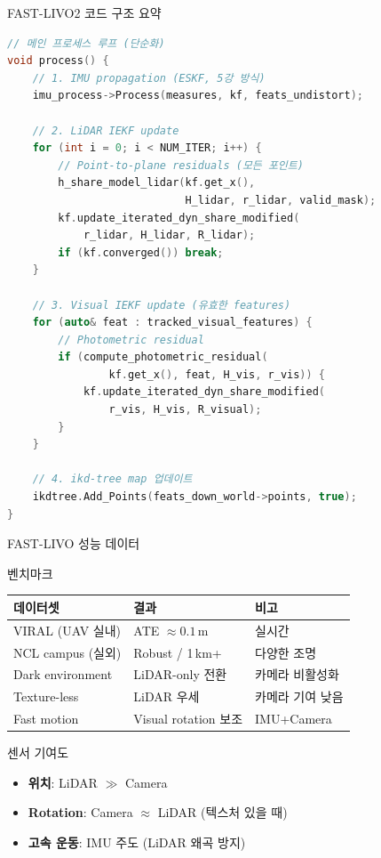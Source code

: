 \begin{frame}[fragile,shrink=10]{FAST-LIVO2 코드 구조 요약}
\begin{lstlisting}[language=C++]
// 메인 프로세스 루프 (단순화)
void process() {
    // 1. IMU propagation (ESKF, 5강 방식)
    imu_process->Process(measures, kf, feats_undistort);

    // 2. LiDAR IEKF update
    for (int i = 0; i < NUM_ITER; i++) {
        // Point-to-plane residuals (모든 포인트)
        h_share_model_lidar(kf.get_x(),
                            H_lidar, r_lidar, valid_mask);
        kf.update_iterated_dyn_share_modified(
            r_lidar, H_lidar, R_lidar);
        if (kf.converged()) break;
    }

    // 3. Visual IEKF update (유효한 features)
    for (auto& feat : tracked_visual_features) {
        // Photometric residual
        if (compute_photometric_residual(
                kf.get_x(), feat, H_vis, r_vis)) {
            kf.update_iterated_dyn_share_modified(
                r_vis, H_vis, R_visual);
        }
    }

    // 4. ikd-tree map 업데이트
    ikdtree.Add_Points(feats_down_world->points, true);
}
\end{lstlisting}
\end{frame}

\begin{frame}{FAST-LIVO 성능 데이터}
  \begin{block}{벤치마크}
    \begin{center}
      \begin{tabular}{lll}
        \hline
        \textbf{데이터셋} & \textbf{결과} & \textbf{비고} \\
        \hline
        VIRAL (UAV 실내) & ATE $\approx0.1$\,m & 실시간 \\
        NCL campus (실외) & Robust / 1\,km+ & 다양한 조명 \\
        Dark environment & LiDAR-only 전환 & 카메라 비활성화 \\
        Texture-less & LiDAR 우세 & 카메라 기여 낮음 \\
        Fast motion & Visual rotation 보조 & IMU+Camera \\
        \hline
      \end{tabular}
    \end{center}
  \end{block}
  \pause
  \begin{block}{센서 기여도}
    \begin{itemize}
      \item \textbf{위치}: LiDAR $\gg$ Camera
      \item \textbf{Rotation}: Camera $\approx$ LiDAR (텍스처 있을 때)
      \item \textbf{고속 운동}: IMU 주도 (LiDAR 왜곡 방지)
    \end{itemize}
  \end{block}
\end{frame}

